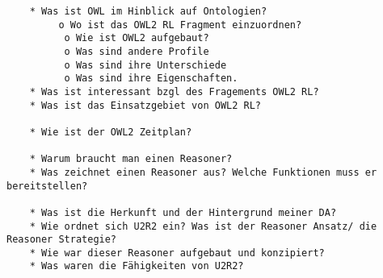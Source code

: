 \begin{verbatim}
    * Was ist OWL im Hinblick auf Ontologien?
         o Wo ist das OWL2 RL Fragment einzuordnen?
          o Wie ist OWL2 aufgebaut?
          o Was sind andere Profile
          o Was sind ihre Unterschiede
          o Was sind ihre Eigenschaften.
    * Was ist interessant bzgl des Fragements OWL2 RL?
    * Was ist das Einsatzgebiet von OWL2 RL?
    
    * Wie ist der OWL2 Zeitplan?
    
    * Warum braucht man einen Reasoner?
    * Was zeichnet einen Reasoner aus? Welche Funktionen muss er bereitstellen?
    
    * Was ist die Herkunft und der Hintergrund meiner DA?
    * Wie ordnet sich U2R2 ein? Was ist der Reasoner Ansatz/ die Reasoner Strategie?
    * Wie war dieser Reasoner aufgebaut und konzipiert?
    * Was waren die Fähigkeiten von U2R2?
\end{verbatim}
